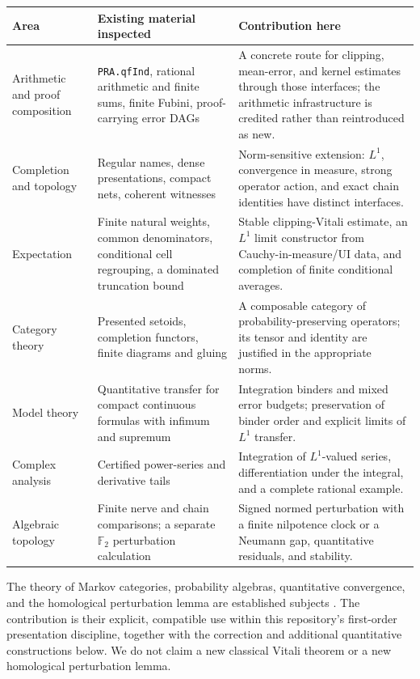 \begin{longtable}{@{}p{}p{}p{}@{}}
\toprule
Area & Existing material inspected & Contribution here\\
\midrule
\endhead
Arithmetic and proof composition & \texttt{PRA.qfInd}, rational arithmetic and finite sums, finite Fubini, proof-carrying error DAGs & A concrete route for clipping, mean-error, and kernel estimates through those interfaces; the arithmetic infrastructure is credited rather than reintroduced as new.\\
Completion and topology & Regular names, dense presentations, compact nets, coherent witnesses & Norm-sensitive extension: $L^1$, convergence in measure, strong operator action, and exact chain identities have distinct interfaces.\\
Expectation & Finite natural weights, common denominators, conditional cell regrouping, a dominated truncation bound & Stable clipping-Vitali estimate, an $L^1$ limit constructor from Cauchy-in-measure/UI data, and completion of finite conditional averages.\\
Category theory & Presented setoids, completion functors, finite diagrams and gluing & A composable category of probability-preserving operators; its tensor and identity are justified in the appropriate norms.\\
Model theory & Quantitative transfer for compact continuous formulas with infimum and supremum & Integration binders and mixed error budgets; preservation of binder order and explicit limits of $L^1$ transfer.\\
Complex analysis & Certified power-series and derivative tails & Integration of $L^1$-valued series, differentiation under the integral, and a complete rational example.\\
Algebraic topology & Finite nerve and chain comparisons; a separate $\mathbb F_2$ perturbation calculation & Signed normed perturbation with a finite nilpotence clock or a Neumann gap, quantitative residuals, and stability.\\
\bottomrule
\end{longtable}

The theory of Markov categories, probability algebras, quantitative convergence,
and the homological perturbation lemma are established subjects
\cite{fritz,berenstein-henson,neri-pischke,avigad-dean-rute,crainic2004}.
The contribution is their explicit, compatible use within this repository's
first-order presentation discipline, together with the correction and
additional quantitative constructions below. We do not claim a new classical
Vitali theorem or a new homological perturbation lemma.

